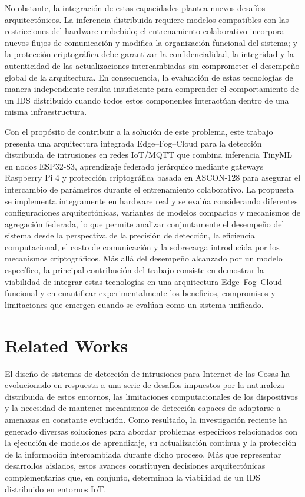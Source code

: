 \documentclass[journal,article,submit,moreauthors]{Definitions/mdpi}
\begin{document}
No obstante, la integración de estas capacidades plantea nuevos desafíos arquitectónicos. La inferencia distribuida requiere modelos compatibles con las restricciones del hardware embebido; el entrenamiento colaborativo incorpora nuevos flujos de comunicación y modifica la organización funcional del sistema; y la protección criptográfica debe garantizar la confidencialidad, la integridad y la autenticidad de las actualizaciones intercambiadas sin comprometer el desempeño global de la arquitectura. En consecuencia, la evaluación de estas tecnologías de manera independiente resulta insuficiente para comprender el comportamiento de un IDS distribuido cuando todos estos componentes interactúan dentro de una misma infraestructura.
%

Con el propósito de contribuir a la solución de este problema, este trabajo presenta una arquitectura integrada Edge--Fog--Cloud para la detección distribuida de intrusiones en redes IoT/MQTT que combina inferencia TinyML en nodos ESP32-S3, aprendizaje federado jerárquico mediante gateways Raspberry Pi 4 y protección criptográfica basada en ASCON-128 para asegurar el intercambio de parámetros durante el entrenamiento colaborativo. La propuesta se implementa íntegramente en hardware real y se evalúa considerando diferentes configuraciones arquitectónicas, variantes de modelos compactos y mecanismos de agregación federada, lo que permite analizar conjuntamente el desempeño del sistema desde la perspectiva de la precisión de detección, la eficiencia computacional, el costo de comunicación y la sobrecarga introducida por los mecanismos criptográficos. Más allá del desempeño alcanzado por un modelo específico, la principal contribución del trabajo consiste en demostrar la viabilidad de integrar estas tecnologías en una arquitectura Edge--Fog--Cloud funcional y en cuantificar experimentalmente los beneficios, compromisos y limitaciones que emergen cuando se evalúan como un sistema unificado.

\section{Related Works}
\label{related}

El diseño de sistemas de detección de intrusiones para Internet de las Cosas ha evolucionado en respuesta a una serie de desafíos impuestos por la naturaleza distribuida de estos entornos, las limitaciones computacionales de los dispositivos y la necesidad de mantener mecanismos de detección capaces de adaptarse a amenazas en constante evolución. Como resultado, la investigación reciente ha generado diversas soluciones para abordar problemas específicos relacionados con la ejecución de modelos de aprendizaje, su actualización continua y la protección de la información intercambiada durante dicho proceso. Más que representar desarrollos aislados, estos avances constituyen decisiones arquitectónicas complementarias que, en conjunto, determinan la viabilidad de un IDS distribuido en entornos IoT.
\end{document}
